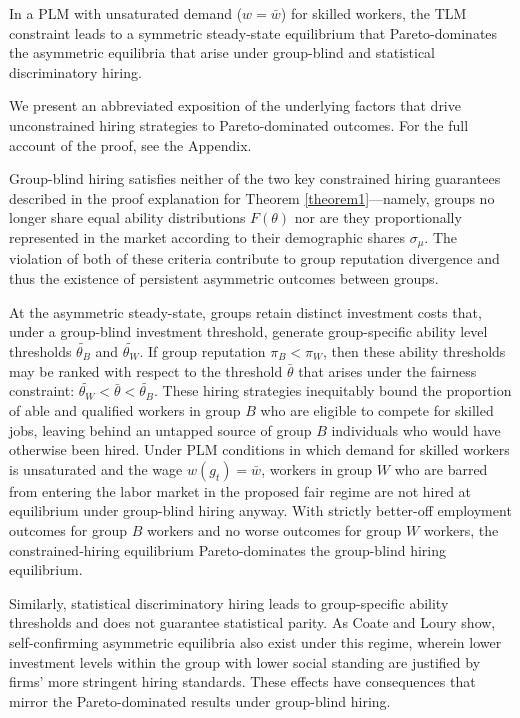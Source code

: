 \documentclass[sigconf]{acmart}
\theoremstyle{definition}
\begin{document}
\begin{theorem}
In a PLM with unsaturated demand ($w = \bar{w}$) for skilled workers, the TLM constraint leads to a symmetric steady-state equilibrium that Pareto-dominates the asymmetric equilibria that arise under group-blind and statistical discriminatory hiring.
\label{theorem2}
\end{theorem}

We present an abbreviated exposition of the underlying factors that drive unconstrained hiring strategies to Pareto-dominated outcomes. For the full account of the proof, see the Appendix.

Group-blind hiring satisfies neither of the two key constrained hiring guarantees described in the proof explanation for Theorem \ref{theorem1}---namely, groups no longer share equal ability distributions $F(\theta)$ nor are they proportionally represented in the market according to their demographic shares $\sigma_\mu$. The violation of both of these criteria contribute to group reputation divergence and thus the existence of persistent asymmetric outcomes between groups. 

At the asymmetric steady-state, groups retain distinct investment costs that, under a group-blind investment threshold, generate group-specific ability level thresholds $\widetilde{\theta_B}$ and $\widetilde{\theta_W}$. If group reputation $\pi_B < \pi_W$, then these ability thresholds may be ranked with respect to the threshold $\bar{\theta}$ that arises under the fairness constraint: $\widetilde{\theta_W} < \bar{\theta} <  \widetilde{\theta_B}$. These hiring strategies inequitably bound the proportion of able and qualified workers in group $B$ who are eligible to compete for skilled jobs, leaving behind an untapped source of group $B$ individuals who would have otherwise been hired. Under PLM conditions in which demand for skilled workers is unsaturated and the wage $w(g_t) = \bar{w}$, workers in group $W$ who are barred from entering the labor market in the proposed fair regime are not hired at equilibrium under group-blind hiring anyway. With strictly better-off employment outcomes for group $B$ workers and no worse outcomes for group $W$ workers, the constrained-hiring equilibrium Pareto-dominates the group-blind hiring equilibrium. 

Similarly, statistical discriminatory hiring leads to group-specific ability thresholds and does not guarantee statistical parity. As Coate and Loury \cite{coate1993will} show, self-confirming asymmetric equilibria also exist under this regime, wherein lower investment levels within the group with lower social standing are justified by firms' more stringent hiring standards. These effects have consequences that mirror the Pareto-dominated results under group-blind hiring.
\end{document}
